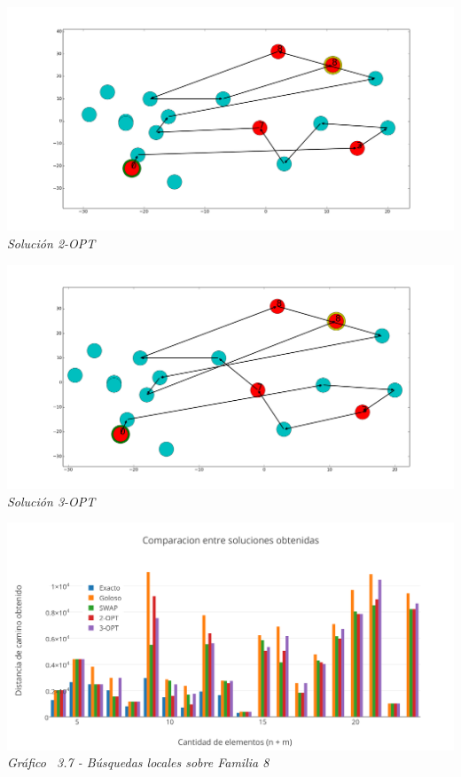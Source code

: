 \vspace*{0.3cm} \vspace*{0.3cm}
  \begin{center}
 \includegraphics[scale=0.3]{./EJ3/random2opt.png}\\
 {            \textit{Soluci\'on 2-OPT}}
  \end{center}
  \vspace*{0.3cm}


\vspace*{0.3cm} \vspace*{0.3cm}
  \begin{center}
 \includegraphics[scale=0.3]{./EJ3/random3opt.png}\\
 {            \textit{Soluci\'on 3-OPT}}
  \end{center}
  \vspace*{0.3cm}
  

\vspace*{0.3cm} \vspace*{0.3cm}
  \begin{center}
 \includegraphics[scale=0.5]{./EJ3/comparacionbusquedaslocalessolucionrandom.png}\\
 {            \textit{Gráfico \ 3.7 - Búsquedas locales sobre Familia 8}}
  \end{center}
  \vspace*{0.3cm}
  

